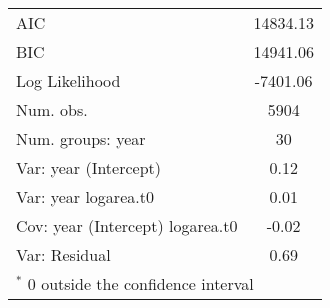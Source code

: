 \documentclass[11pt]{article}
\begin{document}
\begin{table}
\begin{center}
\begin{tabular}{l c }
\hline
AIC                              & 14834.13          \\
BIC                              & 14941.06          \\
Log Likelihood                   & -7401.06          \\
Num. obs.                        & 5904              \\
Num. groups: year                & 30                \\
Var: year (Intercept)            & 0.12              \\
Var: year logarea.t0             & 0.01              \\
Cov: year (Intercept) logarea.t0 & -0.02             \\
Var: Residual                    & 0.69              \\
\hline
\multicolumn{2}{l}{\scriptsize{$^*$ 0 outside the confidence interval}}
\end{tabular}
\label{table:PSSPgrowth-byYr}
\end{center}
\end{table}
\end{document}
